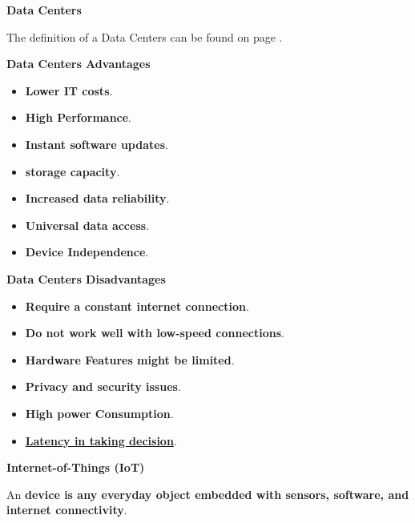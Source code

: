 \newpage

\begin{center}
    \large
    \textcolor{Red3}{\textbf{Data Centers}}
\end{center}

\noindent
The definition of a Data Centers can be found on page \pageref{Data Center definition}.

\begin{flushleft}
    \textcolor{Green3}{ \textbf{Data Centers Advantages}}
\end{flushleft}
\begin{itemize}
    \item \textbf{Lower IT costs}.
    \item \textbf{High Performance}.
    \item \textbf{Instant software updates}.
    \item \textbf{ storage capacity}.
    \item \textbf{Increased data reliability}.
    \item \textbf{Universal data access}.
    \item \textbf{Device Independence}.
\end{itemize}

\begin{flushleft}
    \textcolor{Red2}{ \textbf{Data Centers Disadvantages}}
\end{flushleft}
\begin{itemize}
    \item \textbf{Require a constant internet connection}.
    \item \textbf{Do not work well with low-speed connections}.
    \item \textbf{Hardware Features might be limited}.
    \item \textbf{Privacy and security issues}.
    \item \textbf{High power Consumption}.
    \item \textbf{\underline{Latency in taking decision}}.
\end{itemize}

\newpage

\begin{center}
    \large
    \textcolor{Red3}{\textbf{Internet-of-Things (IoT)}}
\end{center}

\noindent
An  \textbf{device is any everyday object embedded with sensors, software, and internet connectivity}.

